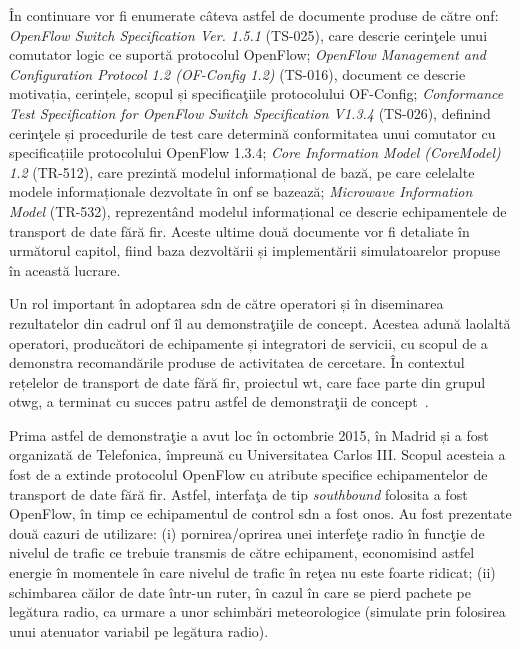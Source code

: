În continuare vor fi enumerate câteva astfel de documente produse de către \gls{onf}: \textit{OpenFlow Switch Specification Ver. 1.5.1} (TS-025), care descrie cerinţele unui comutator logic ce suportă protocolul OpenFlow; \textit{OpenFlow Management	and	Configuration Protocol 1.2 (OF-Config 1.2)} (TS-016), document ce descrie motivația, cerințele, scopul și specificaţiile protocolului OF-Config; \textit{Conformance Test Specification for OpenFlow Switch Specification V1.3.4} (TS-026), definind cerinţele și procedurile de test care determină conformitatea unui comutator cu specificațiile protocolului OpenFlow 1.3.4; \textit{Core Information Model (CoreModel) 1.2} (TR-512), care prezintă modelul informațional de bază, pe care celelalte modele informaționale dezvoltate în \gls{onf} se bazează; \textit{Microwave Information Model} (TR-532), reprezentând modelul informațional ce descrie echipamentele de transport de date fără fir. Aceste ultime două documente vor fi detaliate în următorul capitol, fiind baza dezvoltării și implementării simulatoarelor propuse în această lucrare.

Un rol important în adoptarea \gls{sdn} de către operatori și în diseminarea rezultatelor din cadrul \gls{onf} îl au demonstraţiile de concept. Acestea adună laolaltă operatori, producători de echipamente și integratori de servicii, cu scopul de a demonstra recomandările produse de activitatea de cercetare. În contextul rețelelor de transport de date fără fir, proiectul \gls{wt}, care face parte din grupul \gls{otwg}, a terminat cu succes patru astfel de demonstraţii de concept~\cite{onf2015_poc1, onf2016_poc2, onf2016_poc3}.

Prima astfel de demonstraţie a avut loc în octombrie 2015, în Madrid și a fost organizată de Telefonica, împreună cu Universitatea Carlos III. Scopul acesteia a fost de a extinde protocolul OpenFlow cu atribute specifice echipamentelor de transport de date fără fir. Astfel, interfaţa de tip \textit{southbound} folosita a fost OpenFlow, în timp ce echipamentul de control \gls{sdn} a fost \gls{onos}. Au fost prezentate două cazuri de utilizare: (i) pornirea/oprirea unei interfeţe radio în funcţie de nivelul de trafic ce trebuie transmis de către echipament, economisind astfel energie în momentele în care nivelul de trafic în reţea nu este foarte ridicat; (ii) schimbarea căilor de date într-un ruter, în cazul în care se pierd pachete pe legătura radio, ca urmare a unor schimbări meteorologice (simulate prin folosirea unui atenuator variabil pe legătura radio).

